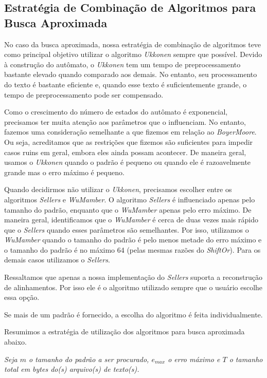 \documentclass[]{article}
\begin{document}
\subsection{Estratégia de Combinação de Algoritmos para Busca Aproximada}

No caso da busca aproximada, nossa estratégia de combinação de algoritmos teve como principal objetivo utilizar o algoritmo \textit{Ukkonen} sempre que possível. Devido à construção do autômato, o \textit{Ukkonen} tem um tempo de preprocessamento bastante elevado quando comparado aos demais. No entanto, seu processamento do texto é bastante eficiente e, quando esse texto é suficientemente grande, o tempo de preprocessamento pode ser compensado.

Como o crescimento do número de estados do autômato é exponencial, precisamos ter muita atenção aos parâmetros que o influenciam. No entanto, fazemos uma consideração semelhante a que fizemos em relação ao \textit{BoyerMoore}. Ou seja, acreditamos que as restrições que fizemos são suficientes para impedir casos ruins em geral, embora eles ainda possam acontecer. De maneira geral, usamos o \textit{Ukkonen} quando o padrão é pequeno ou quando ele é razoavelmente grande mas o erro máximo é pequeno.

Quando decidirmos não utilizar o \textit{Ukkonen}, precisamos escolher entre os algoritmos \textit{Sellers} e \textit{WuMamber}. O algoritmo \textit{Sellers} é influenciado apenas pelo tamanho do padrão, enquanto que o \textit{WuMamber} apenas pelo erro máximo. De maneira geral, identificamos que o \textit{WuMamber} é cerca de duas vezes mais rápido que o \textit{Sellers} quando esses parâmetros são semelhantes. Por isso, utilizamos o \textit{WuMamber} quando o tamanho do padrão é pelo menos metade do erro máximo e o tamanho do padrão é no máximo 64 (pelas mesmas razões do \textit{ShiftOr}). Para os demais casos utilizamos o \textit{Sellers}.

Ressaltamos que apenas a nossa implementação do \textit{Sellers} suporta a reconstrução de alinhamentos. Por isso ele é o algoritmo utilizado sempre que o usuário escolhe essa opção.

Se mais de um padrão é fornecido, a escolha do algoritmo é feita individualmente.

Resumimos a estratégia de utilização dos algoritmos para busca aproximada abaixo.

\textit{Seja $m$ o tamanho do padrão a ser procurado, $e_{max}$ o erro máximo e $T$ o tamanho total em bytes do(s) arquivo(s) de texto(s).}
\end{document}
